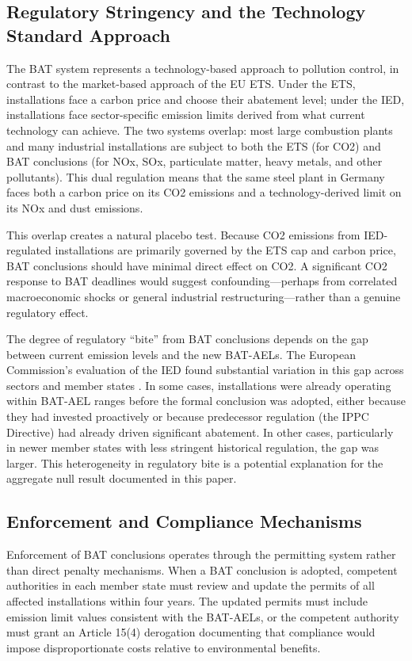\documentclass[12pt]{article}
\begin{document}
\subsection{Regulatory Stringency and the Technology Standard Approach}

The BAT system represents a technology-based approach to pollution control, in contrast to the market-based approach of the EU ETS. Under the ETS, installations face a carbon price and choose their abatement level; under the IED, installations face sector-specific emission limits derived from what current technology can achieve. The two systems overlap: most large combustion plants and many industrial installations are subject to both the ETS (for CO2) and BAT conclusions (for NOx, SOx, particulate matter, heavy metals, and other pollutants). This dual regulation means that the same steel plant in Germany faces both a carbon price on its CO2 emissions and a technology-derived limit on its NOx and dust emissions.

This overlap creates a natural placebo test. Because CO2 emissions from IED-regulated installations are primarily governed by the ETS cap and carbon price, BAT conclusions should have minimal direct effect on CO2. A significant CO2 response to BAT deadlines would suggest confounding---perhaps from correlated macroeconomic shocks or general industrial restructuring---rather than a genuine regulatory effect.

The degree of regulatory ``bite'' from BAT conclusions depends on the gap between current emission levels and the new BAT-AELs. The European Commission's evaluation of the IED found substantial variation in this gap across sectors and member states \citep{european_commission2020}. In some cases, installations were already operating within BAT-AEL ranges before the formal conclusion was adopted, either because they had invested proactively or because predecessor regulation (the IPPC Directive) had already driven significant abatement. In other cases, particularly in newer member states with less stringent historical regulation, the gap was larger. This heterogeneity in regulatory bite is a potential explanation for the aggregate null result documented in this paper.

\subsection{Enforcement and Compliance Mechanisms}

Enforcement of BAT conclusions operates through the permitting system rather than direct penalty mechanisms. When a BAT conclusion is adopted, competent authorities in each member state must review and update the permits of all affected installations within four years. The updated permits must include emission limit values consistent with the BAT-AELs, or the competent authority must grant an Article 15(4) derogation documenting that compliance would impose disproportionate costs relative to environmental benefits.
\end{document}
